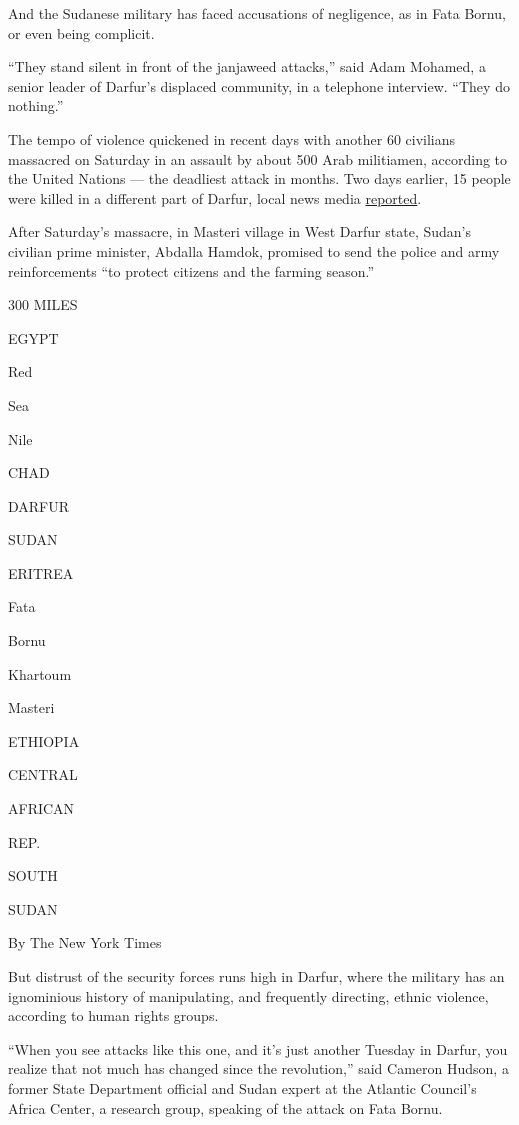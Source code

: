 And the Sudanese military has faced accusations of negligence, as in
Fata Bornu, or even being complicit.

``They stand silent in front of the janjaweed attacks,'' said Adam
Mohamed, a senior leader of Darfur's displaced community, in a telephone
interview. ``They do nothing.''

The tempo of violence quickened in recent days with another 60 civilians
massacred on Saturday in an assault by about 500 Arab militiamen,
according to the United Nations --- the deadliest attack in months. Two
days earlier, 15 people were killed in a different part of Darfur, local
news media
\href{https://www.dabangasudan.org/en/all-news/article/attack-on-south-darfur-village-leaves-15-dead}{reported}.

After Saturday's massacre, in Masteri village in West Darfur state,
Sudan's civilian prime minister, Abdalla Hamdok, promised to send the
police and army reinforcements ``to protect citizens and the farming
season.''

300 MILES

EGYPT

Red

Sea

Nile

CHAD

DARFUR

SUDAN

ERITREA

Fata

Bornu

Khartoum

Masteri

ETHIOPIA

CENTRAL

AFRICAN

REP.

SOUTH

SUDAN

By The New York Times

But distrust of the security forces runs high in Darfur, where the
military has an ignominious history of manipulating, and frequently
directing, ethnic violence, according to human rights groups.

``When you see attacks like this one, and it's just another Tuesday in
Darfur, you realize that not much has changed since the revolution,''
said Cameron Hudson, a former State Department official and Sudan expert
at the Atlantic Council's Africa Center, a research group, speaking of
the attack on Fata Bornu.

